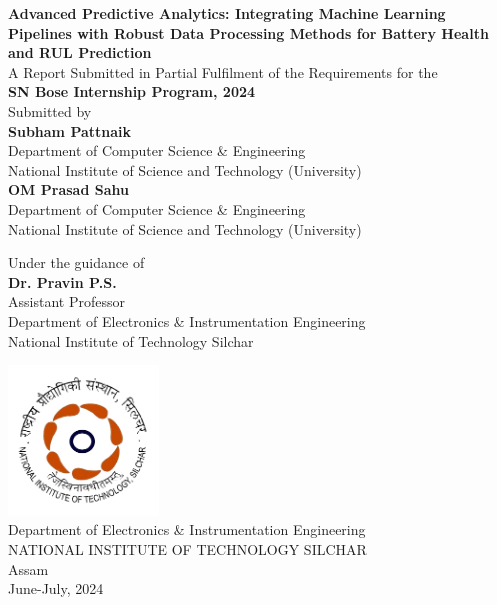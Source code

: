 \begin{titlepage}

\begin{center}

\Large \textbf {Advanced Predictive Analytics: Integrating Machine Learning Pipelines with Robust Data Processing Methods for Battery Health and RUL Prediction}\\[0.4in]

\textup{\small {A Report Submitted in Partial Fulfilment of the Requirements for the} \\ \bf \large{SN Bose Internship Program, 2024}}\\[0.3in]

\normalsize Submitted by \\[0.15in]
\textbf{Subham Pattnaik} \\
Department of Computer Science \& Engineering \\
National Institute of Science and Technology (University)
\\
\vspace{.1in}
\textbf{OM Prasad Sahu} \\
Department of Computer Science \& Engineering \\
National Institute of Science and Technology (University)
\\
\vspace{.3in}

Under the guidance of\\[0.15in]
\textbf{Dr. Pravin P.S.}\\
Assistant Professor\\
Department of Electronics \& Instrumentation Engineering\\
National Institute of Technology Silchar\\
\vspace{.1in}

\includegraphics[width=0.3\textwidth]{nits.png}\\[0.1in]
\small{Department of Electronics \& Instrumentation Engineering}\\
\normalsize
\textsc{NATIONAL INSTITUTE OF TECHNOLOGY SILCHAR}\\
Assam\\
\vspace{0.2cm}
June-July, 2024

\end{center}

\end{titlepage}